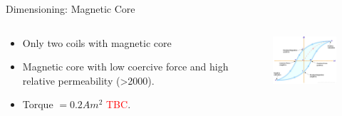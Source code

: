 \documentclass{beamer}
\begin{document}
\begin{frame}{Dimensioning: Magnetic Core}
    
     \begin{columns}[t]
        \begin{column}[t]{0.5\textwidth}
            \begin{itemize}
                \item Only two coils with magnetic core
                \item Magnetic core with low coercive force and high relative permeability (>2000).
                \item Torque $=0.2 Am^2$ \textcolor{red}{TBC}.
            \end{itemize}
        \end{column}
        \begin{column}[t]{0.5\textwidth}
            \begin{figure}[!ht]
                \begin{center}
                    \includegraphics[width=5cm]{figures/hysteresis-loop.jpg}
                \end{center}
            \end{figure}
        \end{column}
    \end{columns}

\end{frame}
\end{document}
